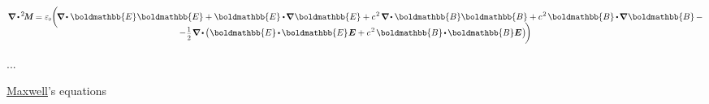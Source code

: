 \begin{multline*}
\boldnabla \hspace{-0.1ex} \dotp \hspace{-0.15ex} \maxwellstress =
\vacuumpermittivity \biggl( \hspace{-0.33ex}
\boldnabla \hspace{-0.15ex} \dotp \boldmathbb{E} \hspace{.1ex} \boldmathbb{E} + \boldmathbb{E} \dotp \hspace{-0.22ex} \boldnabla \hspace{.2ex} \boldmathbb{E}
+ c^{\hspace{.16ex}2} \hspace{.3ex} \boldnabla \hspace{-0.15ex} \dotp \boldmathbb{B} \boldmathbb{B} + c^{\hspace{.16ex}2} \hspace{.3ex} \boldmathbb{B} \hspace{-0.1ex} \dotp \hspace{-0.22ex} \boldnabla \hspace{.2ex} \boldmathbb{B} \biggr. \hspace{.4ex} -
\\[-1em]
%
- \hspace{.1ex} \biggl. \smalldisplaystyleonehalf \hspace{.1ex} \boldnabla \hspace{-0.12ex} \dotp \hspace{-0.15ex} \bigl( \hspace{.1ex} \boldmathbb{E} \hspace{-0.1ex} \dotp \hspace{-0.15ex} \boldmathbb{E} \hspace{.1ex} \bm{E} + c^{\hspace{.16ex}2} \hspace{.3ex} \boldmathbb{B} \hspace{-0.2ex} \dotp \hspace{-0.16ex} \boldmathbb{B} \bm{E} \hspace{.1ex} \bigr) \hspace{-0.33ex}
\biggr)
\end{multline*}

...

\href{https://en.wikipedia.org/wiki/James_Clerk_Maxwell}{Maxwell}’s equations


